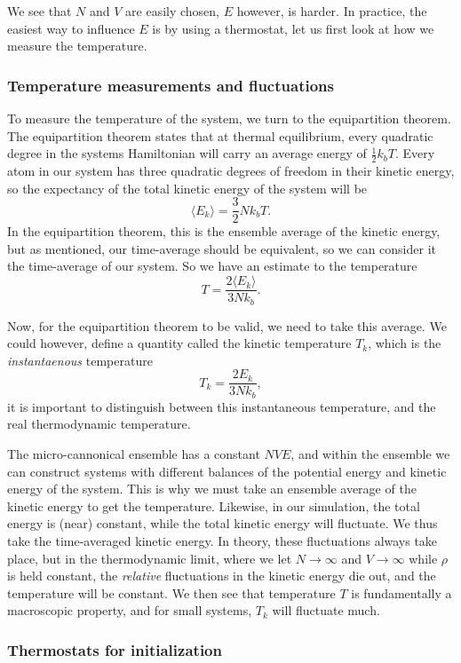 \documentclass[a4paper, 11pt, notitlepage, english]{article}
\begin{document}
We see that $N$ and $V$ are easily chosen, $E$ however, is harder. In practice, the easiest way to influence $E$ is by using a thermostat, let us first look at how we measure the temperature.

\clearpage 

\subsubsection*{Temperature measurements and fluctuations}

To measure the temperature of the system, we turn to the equipartition theorem. The equipartition theorem states that at thermal equilibrium, every quadratic degree in the systems Hamiltonian will carry an average energy of $\frac{1}{2}k_b T$. Every atom in our system has three quadratic degrees of freedom in their kinetic energy, so the expectancy of the total kinetic energy of the system will be 
$$\langle E_k \rangle = \frac{3}{2}Nk_bT.$$
In the equipartition theorem, this is the ensemble average of the kinetic energy, but as mentioned, our time-average should be equivalent, so we can consider it the time-average of our system. So we have an estimate to the temperature
$$T = \frac{2\langle E_k \rangle}{3Nk_b}.$$

Now, for the equipartition theorem to be valid, we need to take this average. We could however, define a quantity called the kinetic temperature $T_k$, which is the \emph{instantaenous} temperature
$$T_k = \frac{2 E_k}{3Nk_b},$$
it is important to distinguish between this instantaneous temperature, and the real thermodynamic temperature.

The micro-cannonical ensemble has a constant $NVE$, and within the ensemble we can construct systems with different balances of the potential energy and kinetic energy of the system. This is why we must take an ensemble average of the kinetic energy to get the temperature. Likewise, in our simulation, the total energy is (near) constant, while the total kinetic energy will fluctuate. We thus take the time-averaged kinetic energy. In theory, these fluctuations always take place, but in the thermodynamic limit, where we let $N\to \infty$ and $V\to \infty$ while $\rho$ is held constant, the \emph{relative} fluctuations in the kinetic energy die out, and the temperature will be constant. We then see that temperature $T$ is fundamentally a macroscopic property, and for small systems, $T_k$ will fluctuate much.

\subsubsection*{Thermostats for initialization}
\end{document}
